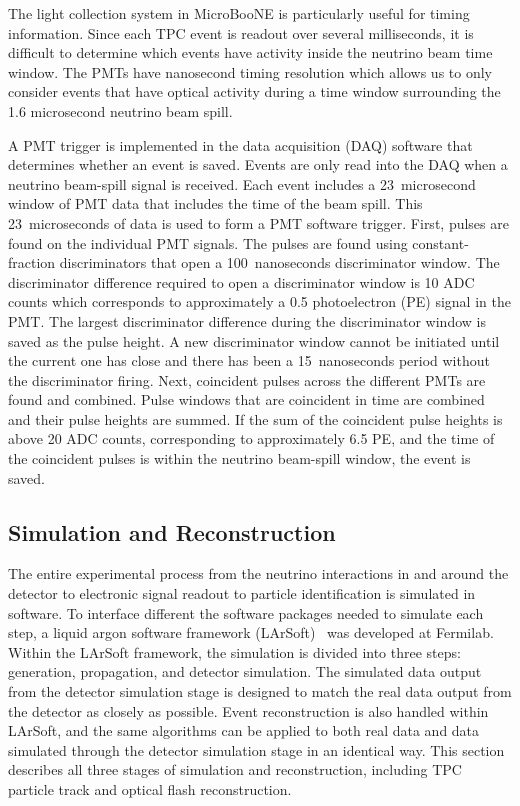     The light collection system in MicroBooNE is particularly useful for timing
    information. Since each TPC event is readout over several milliseconds, it
    is difficult to determine which events have activity inside the neutrino
    beam time window. The PMTs have nanosecond timing resolution which allows
    us to only consider events that have optical activity during a time window
    surrounding the 1.6 microsecond neutrino beam spill. 

    A PMT trigger is implemented in the data acquisition (DAQ) software that
    determines whether an event is saved. Events are only read into the DAQ
    when a neutrino beam-spill signal is received. Each event includes a
    23~microsecond window of PMT data that includes the time of the beam spill.
    This 23~microseconds of data is used to form a PMT software trigger. First,
    pulses are found on the individual PMT signals. The pulses are found using
    constant-fraction discriminators that open a 100~nanoseconds discriminator
    window. The discriminator difference required to open a discriminator
    window is 10 ADC counts which corresponds to approximately a 0.5
    photoelectron (PE) signal in the PMT. The largest discriminator difference
    during the discriminator window is saved as the pulse height. A new
    discriminator window cannot be initiated until the current one has close
    and there has been a 15~nanoseconds period without the discriminator
    firing.  Next, coincident pulses across the different PMTs are found and
    combined.  Pulse windows that are coincident in time are combined and their
    pulse heights are summed. If the sum of the coincident pulse heights is
    above 20 ADC counts, corresponding to approximately 6.5 PE, and the time of
    the coincident pulses is within the neutrino beam-spill window, the event
    is saved.

    


\subsection{Simulation and Reconstruction}\label{reco}
  The entire experimental process from the neutrino interactions in and around
  the detector to electronic signal readout to particle identification is
  simulated in software. To interface different the software packages needed to
  simulate each step, a liquid argon software framework (LArSoft)~\cite{larsoft}
  was developed at Fermilab. Within the LArSoft framework, the simulation is
  divided into three steps: generation, propagation, and detector simulation.
  The simulated data output from the detector simulation stage is designed to
  match the real data output from the detector as closely as possible. Event
  reconstruction is also handled within LArSoft, and the same algorithms can be
  applied to both real data and data simulated through the detector simulation
  stage in an identical way. This section describes all three stages of
  simulation and reconstruction, including TPC particle track and optical flash
  reconstruction.
